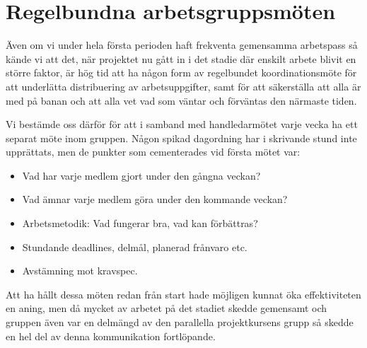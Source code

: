 \section{Regelbundna arbetsgruppsmöten}
Även om vi under hela första perioden haft frekventa gemensamma arbetspass så kände vi att det, när projektet nu gått in i det stadie där enskilt arbete blivit en större faktor, är hög tid att ha någon form av regelbundet koordinationsmöte för att underlätta distribuering av arbetsuppgifter, samt för att säkerställa att alla är med på banan och att alla vet vad som väntar och förväntas den närmaste tiden.

Vi bestämde oss därför för att i samband med handledarmötet varje vecka ha ett separat möte inom gruppen. Någon spikad dagordning har i skrivande stund inte upprättats, men de punkter som cementerades vid första mötet var:
\begin{itemize}
\item Vad har varje medlem gjort under den gångna veckan?
\item Vad ämnar varje medlem göra under den kommande veckan?
\item Arbetsmetodik: Vad fungerar bra, vad kan förbättras?
\item Stundande deadlines, delmål, planerad frånvaro etc.
\item Avstämning mot kravspec.
\end{itemize}

Att ha hållt dessa möten redan från start hade möjligen kunnat öka effektiviteten en aning, men då mycket av arbetet på det stadiet skedde gemensamt och gruppen även var en delmängd av den parallella projektkursens grupp så skedde en hel del av denna kommunikation fortlöpande.
